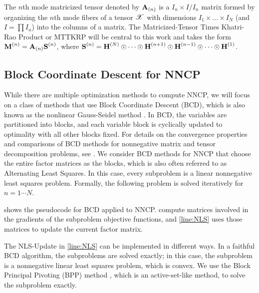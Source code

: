 The $n$th mode matricized tensor denoted by $\M{A}_{(n)}$ is a $I_n\times I/I_n$ matrix formed by organizing the $n$th mode fibers of a tensor $\T{X}$ with dimensions $I_{1} \times ... \times I_{N}$ (and $I=\prod I_n$) into the columns of a matrix. 
The Matricized-Tensor Times Khatri-Rao Product or MTTKRP will be central to this work and takes the form $\Mn{M}{n} = \Mz{A}{n} \Mn{S}{n}$, where $\Mn{S}{n}= \Mn{H}{N} \Khat \cdots \Khat \Mn{H}{n+1} \Khat \Mn{H}{n-1} \Khat  \cdots \Khat \Mn{H}{1}$. 

\subsection {Block Coordinate Descent for NNCP}

While there are multiple optimization methods to compute NNCP, we will focus on a class of methods that use Block Coordinate Descent (BCD), which is also known as the nonlinear Gauss-Seidel method \cite{Bertsekas1999}.
In BCD, the variables are partitioned into blocks, and each variable block is cyclically updated to optimality with all other blocks fixed.
For details on the convergence properties and comparisons of BCD methods for nonnegative matrix and tensor decomposition problems, see \cite{KHP2014}.
We consider BCD methods for NNCP that choose the entire factor matrices as the blocks, which is also often referred to as Alternating Least Squares.
In this case, every subproblem is a linear nonnegative least squares problem. Formally, the following problem 
is solved iteratively for $n = 1 \cdots N$.



 shows the pseudocode for BCD applied to NNCP.
 compute matrices involved in the gradients of the subproblem objective functions, and \cref{line:NLS} uses those matrices to update the current factor matrix.

The NLS-Update in \cref{line:NLS} can be implemented in different ways.
In a faithful BCD algorithm, the subproblems are solved exactly; in this case, the subproblem is a nonnegative linear least squares problem, which is convex.
We use the Block Principal Pivoting (BPP) method \cite{KP2011,KHP2014}, which is an active-set-like method, to solve the subproblem exactly.


